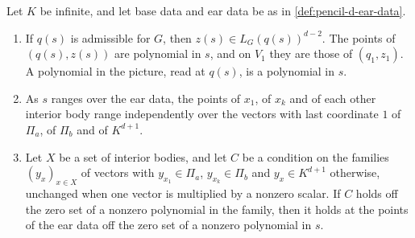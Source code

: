 \begin{lemma}
  \label{lem:pencil-d-ear-data}
  \leanok
  Let $K$ be infinite, and let base data and ear data be as in
  \cref{def:pencil-d-ear-data}.
  \begin{enumerate}
    \item If $q(s)$ is admissible for $G$, then
      $z(s) \in L_G(q(s))^{d-2}$. The points of $(q(s), z(s))$ are
      polynomial in $s$, and on $V_1$ they are those of $(q_1, z_1)$. A
      polynomial in the picture, read at $q(s)$, is a polynomial in $s$.
    \item As $s$ ranges over the ear data, the points of $x_1$, of $x_k$
      and of each other interior body range independently over the
      vectors with last coordinate $1$ of $\Pi_a$, of $\Pi_b$ and of
      $K^{d+1}$.
    \item Let $X$ be a set of interior bodies, and let $C$ be a condition
      on the families $(y_x)_{x \in X}$ of vectors with
      $y_{x_1} \in \Pi_a$, $y_{x_k} \in \Pi_b$ and $y_x \in K^{d+1}$
      otherwise, unchanged when one vector is multiplied by a nonzero
      scalar. If $C$ holds off the zero set of a nonzero polynomial in the
      family, then it holds at the points of the ear data off the zero set
      of a nonzero polynomial in $s$.
  \end{enumerate}
\end{lemma}
